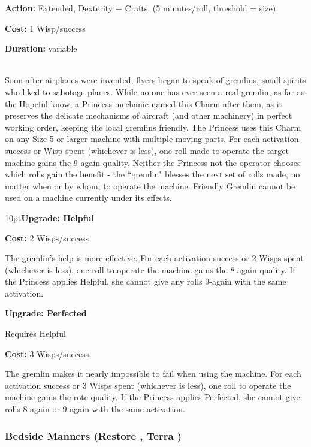 \noindent \textbf{Action:} Extended, Dexterity + Crafts, (5 minutes/roll, threshold = size)

\noindent \textbf{Cost:} 1 Wisp/success

\noindent \textbf{Duration:} variable \\\

\noindent Soon after airplanes were invented, flyers began to speak of gremlins, small spirits who liked to sabotage planes. While no one has ever seen a real gremlin, as far as the Hopeful know, a Princess-mechanic named this Charm after them, as it preserves the delicate mechanisms of aircraft (and other machinery) in perfect working order, keeping the local gremlins friendly. The Princess uses this Charm on any Size 5 or larger machine with multiple moving parts. For each activation success or Wisp spent (whichever is less), one roll made to operate the target machine gains the 9-again quality. Neither the Princess not the operator chooses which rolls gain the benefit - the \textquotedblleft gremlin" blesses the next set of rolls made, no matter when or by whom, to operate the machine. Friendly Gremlin cannot be used on a machine currently under its effects.

\begin{myindentpar}{10pt}\textbf{Upgrade: Helpful}

\noindent \textbf{Cost:} 2 Wisps/success

The gremlin's help is more effective. For each activation success or 2 Wisps spent (whichever is less), one roll to operate the machine gains the 8-again quality. If the Princess applies Helpful, she cannot give any rolls 9-again with the same activation.

\textbf{Upgrade: Perfected}

Requires Helpful

\noindent \textbf{Cost:} 3 Wisps/success

The gremlin makes it nearly impossible to fail when using the machine. For each activation success or 3 Wisps spent (whichever is less), one roll to operate the machine gains the rote quality. If the Princess applies Perfected, she cannot give rolls 8-again or 9-again with the same activation.\end{myindentpar}

\subsubsection*{Bedside Manners (Restore \textbullet, Terra \textbullet)}

